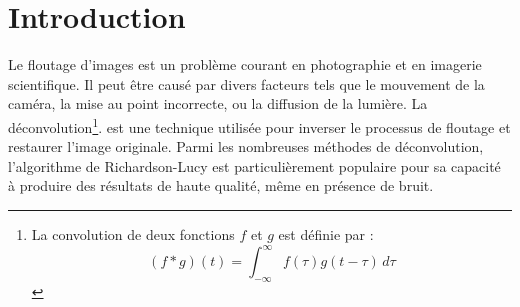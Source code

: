 \section{Introduction}
Le floutage d'images est un problème courant en photographie et en imagerie scientifique. 
Il peut être causé par divers facteurs tels que le mouvement de la caméra, la mise au point incorrecte, ou la diffusion de la lumière. 
La déconvolution\footnote{La convolution de deux fonctions \( f \) et \( g \) est définie par :
\[
(f * g)(t) = \int_{-\infty}^{\infty} f(\tau) g(t - \tau) \, d\tau
\]}. est une technique utilisée pour inverser le processus de floutage et restaurer l'image originale. Parmi les nombreuses méthodes de déconvolution, l'algorithme de Richardson-Lucy est particulièrement populaire pour sa capacité à produire des résultats de haute qualité, même en présence de bruit.
